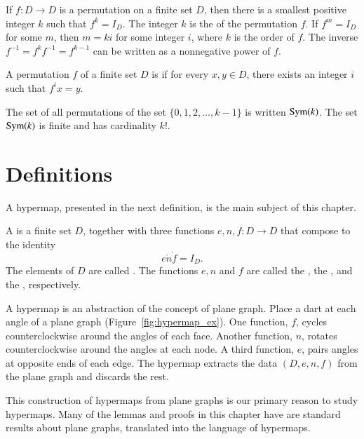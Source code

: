 If $f:D\to D$ is a permutation on a finite set $D$, then there is a
smallest positive integer $k$ such that $f^k=I_D$.  The integer $k$ is
the  of the permutation $f$.  If $f^m=I_D$ for some
$m$, then $m = k i$ for some integer $i$, where $k$ is the order of
$f$. The inverse $f^{-1} = f^k f^{-1} = f^{k-1}$ can be written as a
nonnegative power of $f$.

A permutation $f$ of a finite set $D$ is  
if for every $x,y\in D$, there exists an integer $i$ such that
$f^i x = y$.

The set of all permutations of the set $\{0,1,2,\ldots,k-1\}$ is written ${\operatorname{Sym}}(k)$.
The set ${\operatorname{Sym}}(k)$ is finite and has cardinality $k!$.



\section{Definitions}

A hypermap, presented in the next definition, is the main subject of this chapter.

\begin{definition}\label{def:hypermap}  
  A  is a finite set $D$, together with three functions
  $e,n,f:D\to D$ that compose to the identity
  \[ 
e\ocirc n\ocirc f = I_D.
\]  The
elements of $D$ are called .  The functions $e,n$ and
$f$ are called the , the , and
the , respectively. 
%
%
%
%
\end{definition}


\begin{remark}\label{rem:hypermap} 
  A hypermap is an abstraction of the concept of plane graph.  Place a
  dart at each angle of a plane graph (Figure~\ref{fig:hypermap_ex}).
  One function, $f$, cycles counterclockwise around the angles of each
  face.  Another function, $n$, rotates counterclockwise around the
  angles at each node.  A third function, $e$, pairs angles at
  opposite ends of each edge.  The hypermap extracts the data
  $(D,e,n,f)$ from the plane graph and discards the rest.

  This construction of hypermaps from plane graphs is our primary
  reason to study hypermaps.  Many of the lemmas and proofs in this
  chapter have are standard results about plane graphs, translated
  into the language of hypermaps.  
%
%
\end{remark}


